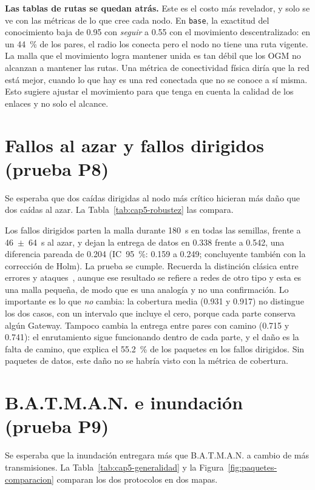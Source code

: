 \textbf{Las tablas de rutas se quedan atrás.} Este es el costo más revelador,
y solo se ve con las métricas de lo que cree cada nodo. En \texttt{base}, la
exactitud del conocimiento baja de 0.95 con \textit{seguir} a 0.55 con el
movimiento descentralizado: en un 44~\% de los pares, el radio los conecta pero
el nodo no tiene una ruta vigente. La malla que el movimiento logra mantener
unida es tan débil que los OGM no alcanzan a mantener las rutas. Una métrica de
conectividad física diría que la red está mejor, cuando lo que hay es una red
conectada que no se conoce a sí misma. Esto sugiere ajustar el movimiento para
que tenga en cuenta la calidad de los enlaces y no solo el alcance.

\section{Fallos al azar y fallos dirigidos (prueba P8)}
\label{sec:res-robustez}

Se esperaba que dos caídas dirigidas al nodo más crítico hicieran más daño que
dos caídas al azar. La Tabla~\ref{tab:cap5-robustez} las compara.



Los fallos dirigidos parten la malla durante 180~s en todas las semillas,
frente a 46~$\pm$~64~s al azar, y dejan la entrega de datos en 0.338 frente a
0.542, una diferencia pareada de 0.204 (IC~95~\%: 0.159 a 0.249; concluyente
también con la corrección de Holm). La prueba se
cumple. Recuerda la distinción clásica entre errores y
ataques~\cite{Albert2000ErrorAttack}, aunque ese resultado se refiere a redes
de otro tipo y esta es una malla pequeña, de modo que es una analogía y no una
confirmación. Lo importante es lo que \textit{no} cambia: la cobertura media
(0.931 y 0.917) no distingue los dos casos, con un intervalo que incluye el
cero, porque cada parte conserva algún Gateway. Tampoco cambia la entrega entre
pares con camino (0.715 y 0.741): el enrutamiento sigue funcionando dentro de
cada parte, y el daño es la falta de camino, que explica el 55.2~\% de los
paquetes en los fallos dirigidos. Sin paquetes de datos, este daño no se habría
visto con la métrica de cobertura.

\section{B.A.T.M.A.N. e inundación (prueba P9)}
\label{sec:res-generalidad}

Se esperaba que la inundación entregara más que B.A.T.M.A.N. a cambio de más
transmisiones. La Tabla~\ref{tab:cap5-generalidad} y la
Figura~\ref{fig:paquetes-comparacion} comparan los dos protocolos en dos mapas.


